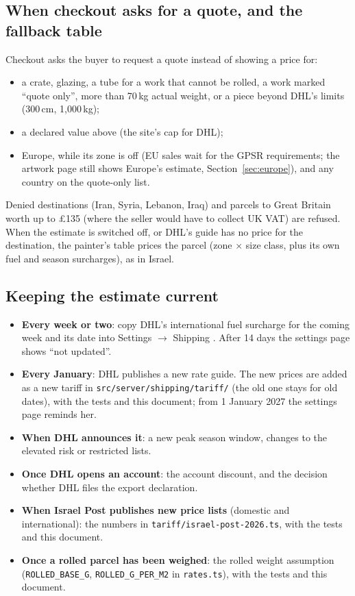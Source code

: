 \documentclass[11pt,a4paper]{article}
\newcommand{\usd}[1]{\text{USD\,#1}}
\newcommand{\code}[1]{\nolinkurl{#1}}  %
\begin{document}
\subsection{When checkout asks for a quote, and the fallback table}\label{sec:quote}
Checkout asks the buyer to request a quote instead of showing a price for:
\begin{itemize}
  \item a crate, glazing, a tube for a work that cannot be rolled, a work marked ``quote only'',
    more than 70\,kg actual weight, or a piece beyond DHL's limits (300\,cm, 1{,}000\,kg);
  \item a declared value above \usd{2{,}500} (the site's cap for DHL);
  \item Europe, while its zone is off (EU sales wait for the GPSR requirements; the artwork page
    still shows Europe's estimate, Section~\ref{sec:europe}), and any country on the quote-only
    list.
\end{itemize}
Denied destinations (Iran, Syria, Lebanon, Iraq) and parcels to Great Britain worth up to
\pounds135 (where the seller would have to collect UK VAT) are refused. When the estimate is
switched off, or DHL's guide has no price for the destination, the painter's table prices the
parcel (zone $\times$ size class, plus its own fuel and season surcharges), as in Israel.

\subsection{Keeping the estimate current}
\begin{itemize}
  \item \textbf{Every week or two}: copy DHL's international fuel surcharge for the coming week
    and its date into Settings $\to$ Shipping \cite{dhlsur}. After 14 days the settings page
    shows ``not updated''.
  \item \textbf{Every January}: DHL publishes a new rate guide. The new prices are added as a new
    tariff in \code{src/server/shipping/tariff/} (the old one stays for old dates), with the tests
    and this document; from 1 January 2027 the settings page reminds her.
  \item \textbf{When DHL announces it}: a new peak season window, changes to the elevated risk or
    restricted lists.
  \item \textbf{Once DHL opens an account}: the account discount, and the decision whether DHL
    files the export declaration.
  \item \textbf{When Israel Post publishes new price lists} (domestic and international): the
    numbers in \code{tariff/israel-post-2026.ts}, with the tests and this document.
  \item \textbf{Once a rolled parcel has been weighed}: the rolled weight assumption
    (\code{ROLLED\_BASE\_G}, \code{ROLLED\_G\_PER\_M2} in \code{rates.ts}), with the tests and
    this document.
\end{itemize}
\end{document}
